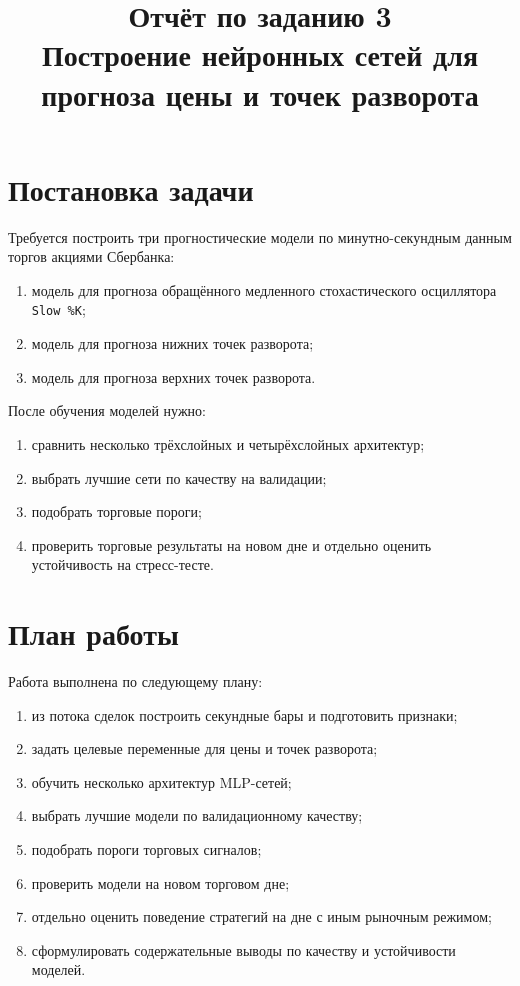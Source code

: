 \documentclass[12pt,a4paper]{article}
\title{Отчёт по заданию 3\\Построение нейронных сетей для прогноза цены и точек разворота}
\author{}
\date{}
\begin{document}
\maketitle
\tableofcontents
\newpage

\section{Постановка задачи}
Требуется построить три прогностические модели по минутно-секундным данным торгов акциями Сбербанка:
\begin{enumerate}
    \item модель для прогноза обращённого медленного стохастического осциллятора \texttt{Slow \%K};
    \item модель для прогноза нижних точек разворота;
    \item модель для прогноза верхних точек разворота.
\end{enumerate}

После обучения моделей нужно:
\begin{enumerate}
    \item сравнить несколько трёхслойных и четырёхслойных архитектур;
    \item выбрать лучшие сети по качеству на валидации;
    \item подобрать торговые пороги;
    \item проверить торговые результаты на новом дне и отдельно оценить устойчивость на стресс-тесте.
\end{enumerate}

\section{План работы}
Работа выполнена по следующему плану:
\begin{enumerate}
    \item из потока сделок построить секундные бары и подготовить признаки;
    \item задать целевые переменные для цены и точек разворота;
    \item обучить несколько архитектур MLP-сетей;
    \item выбрать лучшие модели по валидационному качеству;
    \item подобрать пороги торговых сигналов;
    \item проверить модели на новом торговом дне;
    \item отдельно оценить поведение стратегий на дне с иным рыночным режимом;
    \item сформулировать содержательные выводы по качеству и устойчивости моделей.
\end{enumerate}
\end{document}
